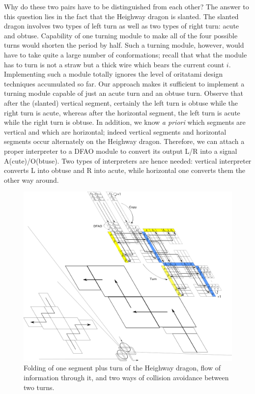 \documentclass{article}
\theoremstyle{remark}
\begin{document}
Why do these two pairs have to be distinguished from each other? 
The answer to this question lies in the fact that the Heighway dragon is slanted. 
The slanted dragon involves two types of left turn as well as two types of right turn: acute and obtuse. 
Capability of one turning module to make all of the four possible turns would shorten the period by half. 
Such a turning module, however, would have to take quite a large number of conformations; recall that what the module has to turn is not a straw but a thick wire which bears the current count $i$. 
Implementing such a module totally ignores the level of oritatami design techniques accumulated so far.  
Our approach makes it sufficient to implement a turning module capable of just an acute turn and an obtuse turn. 
Observe that after the (slanted) vertical segment, certainly the left turn is obtuse while the right turn is acute, whereas after the horizontal segment, the left turn is acute while the right turn is obtuse. 
In addition, we know \textit{a priori} which segments are vertical and which are horizontal; indeed vertical segments and horizontal segments occur alternately on the Heighway dragon. 
Therefore, we can attach a proper interpreter to a DFAO module to convert its output L/R into a signal A(cute)/O(btuse). 
Two types of interpreters are hence needed: vertical interpreter converts L into obtuse and R into acute, while horizontal one converts them the other way around. 

\begin{figure}[h]
\includegraphics[width=\linewidth]{dragon_vol4.pdf}
\caption{
Folding of one segment plus turn of the Heighway dragon, flow of information through it, and two ways of collision avoidance between two turns.
}
\label{fig:abst_dragon}
\end{figure}
\end{document}
